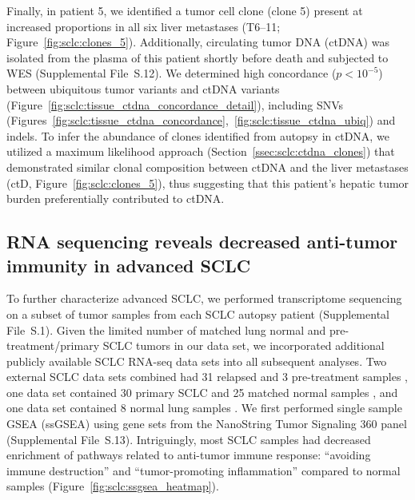 Finally, in patient 5, we identified a tumor cell clone (clone 5) present at increased proportions in all six liver metastases (T6--11; Figure~\ref{fig:sclc:clones_5}). Additionally, circulating tumor DNA (ctDNA) was isolated from the plasma of this patient shortly before death and subjected to WES (Supplemental File~S\thechapter{}.12). We determined high concordance ($p < 10^{-5}$) between ubiquitous tumor variants and ctDNA variants (Figure~\ref{fig:sclc:tissue_ctdna_concordance_detail}), including SNVs (Figures~\ref{fig:sclc:tissue_ctdna_concordance},~\ref{fig:sclc:tissue_ctdna_ubiq}) and indels. To infer the abundance of clones identified from autopsy in ctDNA, we utilized a maximum likelihood approach (Section~\ref{ssec:sclc:ctdna_clones}) that demonstrated similar clonal composition between ctDNA and the liver metastases (ctD,  Figure~\ref{fig:sclc:clones_5}), thus suggesting that this patient's hepatic tumor burden preferentially contributed to ctDNA\@.

\subsection[RNA sequencing reveals decreased anti-tumor immunity in SCLC]{RNA sequencing reveals decreased anti-tumor immunity in advanced SCLC}
To further characterize advanced SCLC, we performed transcriptome sequencing on a subset of tumor samples from each SCLC autopsy patient (Supplemental File~S\thechapter{}.1). Given the limited number of matched lung normal and pre-treatment\slash{}primary SCLC tumors in our data set, we incorporated additional publicly available SCLC RNA-seq data sets \cite{rudin2012,wagner2018,weiss2017,fagerberg2014} into all subsequent analyses. Two external SCLC data sets combined had 31 relapsed and 3 pre-treatment samples \cite{wagner2018,weiss2017}, one data set contained 30 primary SCLC and 25 matched normal samples \cite{rudin2012}, and one data set contained 8 normal lung samples \cite{fagerberg2014}. We first performed single sample GSEA (ssGSEA) \cite{barbie2009} using gene sets from the NanoString Tumor Signaling 360 panel (Supplemental File~S\thechapter{}.13). Intriguingly, most SCLC samples had decreased enrichment of pathways related to anti-tumor immune response: ``avoiding immune destruction'' and ``tumor-promoting inflammation'' compared to normal samples (Figure~\ref{fig:sclc:ssgsea_heatmap}).

